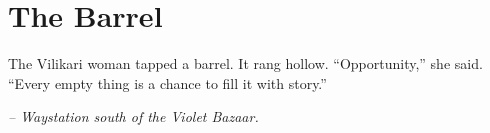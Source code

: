 \chapter*{The Barrel}

The Vilikari woman tapped a barrel. It rang hollow. ``Opportunity,'' she said. ``Every empty thing is a chance to fill it with story.''

\smallskip

\noindent \textit{-- Waystation south of the Violet Bazaar.}

